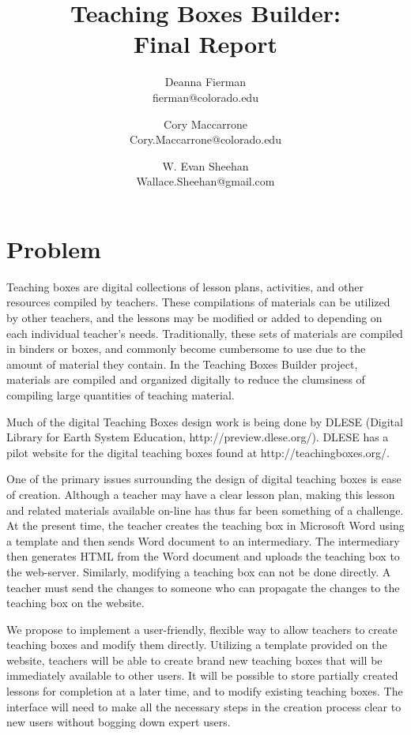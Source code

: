\documentclass[10pt,letter]{article}
\title{Teaching Boxes Builder: \\ Final Report}
\author{Deanna Fierman  \\ \small{fierman@colorado.edu} \and
        Cory Maccarrone \\ \small{Cory.Maccarrone@colorado.edu} \and
		W. Evan Sheehan \\ \small{Wallace.Sheehan@gmail.com}}
\newcommand{\blankpage}{\hfill\thispagestyle{empty}\pagebreak\addtocounter{page}{-1}}
\begin{document}
\maketitle
\pagebreak
\blankpage

\tableofcontents
\cfoot{\hrule \thepage}
\pagebreak

\blankpage


\section{Problem}
Teaching boxes are digital collections of lesson plans, activities, and other
resources compiled by teachers. These compilations of materials can be utilized
by other teachers, and the lessons may be modified or added to depending on each
individual teacher's needs. Traditionally, these sets of materials are compiled
in binders or boxes, and commonly become cumbersome to use due to the amount of
material they contain.  In the Teaching Boxes Builder project, materials are
compiled and organized digitally to reduce the clumsiness of compiling large
quantities of teaching material.

Much of the digital Teaching Boxes design work is being done by DLESE (Digital
Library for Earth System Education, http://preview.dlese.org/). DLESE has a
pilot website for the digital teaching boxes found at http://teachingboxes.org/.

One of the primary issues surrounding the design of digital teaching boxes is
ease of creation.  Although a teacher may have a clear lesson plan, making this
lesson and related materials available on-line has thus far been something of a
challenge.  At the present time, the teacher creates the teaching box in
Microsoft Word using a template and then sends Word document to an intermediary.
The intermediary then generates HTML from the Word document and uploads the
teaching box to the web-server. Similarly, modifying a teaching box can not be
done directly. A teacher must send the changes to someone who can propagate the
changes to the teaching box on the website.

We propose to implement a user-friendly, flexible way to allow teachers to
create teaching boxes and modify them directly. Utilizing a template provided on
the website, teachers will be able to create brand new teaching boxes that will
be immediately available to other users. It will be possible to store partially
created lessons for completion at a later time, and to modify existing teaching
boxes. The interface will need to make all the necessary steps in the creation
process clear to new users without bogging down expert users.
\end{document}

